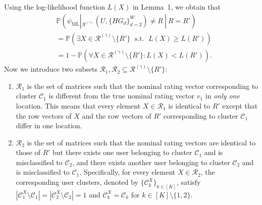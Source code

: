 \documentclass{article}
\begin{document}
Using the log-likelihood function $L(X)$ in Lemma~1, we obtain that
\begin{equation}\label{27}
	\begin{aligned}
		& \mathbb{P} ( \psi_\text{ML}|_{\mathcal{R}^{(\gamma)}} (U, \{HG_d\}_{d=2}^W ) \neq R \ | \ R = R' )\\
		&= \mathbb{P} (\exists X \in \mathcal{R}^{(\gamma)} \setminus \{R'\} \operatorname{ \ s.t. \ } L(X)\geq L(R') ) \\
		& = 1- \mathbb{P} (\forall  X \in \mathcal{R}^{(\gamma)} \setminus \{R'\}: L(X)<L(R')).
	\end{aligned}
\end{equation}
Now we introduce two subsets $\mathcal{R}_1, \mathcal{R}_2 \subseteq \mathcal{R}^{(\gamma)} \setminus \{R'\}$:
\begin{enumerate}[label=(\roman*)]
    \item $\mathcal{R}_1$ is the set of matrices such that the nominal rating vector corresponding to  cluster $\mathcal{C}_1$ is different from the true nominal rating vector $v_1$ in \emph{only one} location. This means that every element $X\in\mathcal{R}_1$ is identical to $R'$ except that the row vectors of $X$ and the row vectors of $R'$ corresponding to cluster $\mathcal{C}_1$ differ in one location.   %
    \item $\mathcal{R}_2$ is the set of matrices such that the nominal rating vectors are identical to those of $R'$ but there exists  one user belonging to cluster $\mathcal{C}_1$ and is misclassified to $\mathcal{C}_2$, and there exists another user belonging to cluster $\mathcal{C}_2$ and is misclassified to $\mathcal{C}_1$. Specifically, for every element $X\in\mathcal{R}_2$, the corresponding user clusters, denoted by $\{\mathcal{C}_k^X\}_{k \in [K]}$, satisfy $|\mathcal{C}_1^X \setminus \mathcal{C}_1| = |\mathcal{C}_2^X \setminus \mathcal{C}_2| = 1$ and  $\mathcal{C}_k^X = \mathcal{C}_k$ for $k \in [K]\setminus \{1,2\}$. 
    
\end{enumerate}
\end{document}
